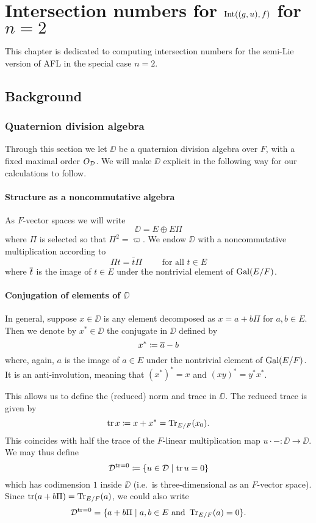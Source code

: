 \chapter{Intersection numbers for $\operatorname{Int}((g,u), f)$ for $n = 2$}
This chapter is dedicated to computing intersection numbers
for the semi-Lie version of AFL in the special case $n = 2$.

\section{Background}
\subsection{Quaternion division algebra}
Through this section we let $\DD$ be a quaternion division algebra over $F$,
with a fixed maximal order $O_\mathcal D$.
We will make $\DD$ explicit in the following way for our calculations to follow.

\subsubsection{Structure as a noncommutative algebra}
As $F$-vector spaces we will write
\[ \DD = E \oplus E \Pi \]
where $\Pi$ is selected so that $\Pi^2 = \varpi$.
We endow $\DD$ with a noncommutative multiplication according to
\[ \Pi t = \bar t \Pi \qquad \text{ for all } t \in E \]
where $\overline{t}$ is the image of $t \in E$ under the nontrivial element of $\operatorname{Gal}(E/F)$.

\subsubsection{Conjugation of elements of $\DD$}
In general, suppose $x \in \DD$ is any element
decomposed as $x = a + b \Pi$ for $a,b \in E$.
Then we denote by $x^\ast \in \DD$ the conjugate in $\DD$ defined by
\[ x^\ast \coloneqq \overline{a} - b \]
where, again, $a$ is the image of $a \in E$ under the nontrivial element of $\operatorname{Gal}(E/F)$.
It is an anti-involution, meaning that $(x^\ast)^\ast = x$ and $(xy)^\ast = y^\ast x^\ast$.

This allows us to define the (reduced) norm and trace in $\DD$.
The reduced trace is given by
\[ \operatorname{tr} x \coloneqq x + x^\ast = \operatorname{Tr}_{E/F}(x_0). \]
This coincides with half the trace of the
$F$-linear multiplication map $u \cdot - \colon \DD \to \DD$.
We may thus define
\[ \mathcal D^{\operatorname{tr} = 0} \coloneqq \left\{ u \in \mathcal D \mid \operatorname{tr} u = 0 \right\} \]
which has codimension $1$ inside $\DD$ (i.e.\ is three-dimensional as an $F$-vector space).
Since $\operatorname{tr}(a+b\Pi) = \operatorname{Tr}_{E/F}(a)$, we could also write
\[ \mathcal D^{\operatorname{tr} = 0} = \{ a+b\Pi \mid a,b \in E \text{ and } \operatorname{Tr}_{E/F}(a) = 0 \}. \]


